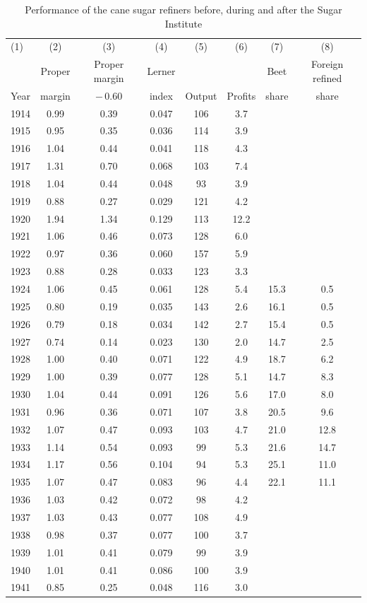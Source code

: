 \begin{table}[htbp]
\centering
\caption{Performance of the cane sugar refiners before, during and after the Sugar Institute}\label{tab:13-gm-t1}
\small
\begin{tabular}{@{}lccccccc@{}}
\toprule
(1) & (2) & (3) & (4) & (5) & (6) & (7) & (8)\\
 & Proper & Proper margin & Lerner & & & Beet & Foreign refined\\
Year & margin & $-\,0.60$ & index & Output & Profits & share & share\\
\midrule
1914 & 0.99 & 0.39 & 0.047 & 106 & 3.7 & & \\
1915 & 0.95 & 0.35 & 0.036 & 114 & 3.9 & & \\
1916 & 1.04 & 0.44 & 0.041 & 118 & 4.3 & & \\
1917 & 1.31 & 0.70 & 0.068 & 103 & 7.4 & & \\
1918 & 1.04 & 0.44 & 0.048 & 93 & 3.9 & & \\
1919 & 0.88 & 0.27 & 0.029 & 121 & 4.2 & & \\
1920 & 1.94 & 1.34 & 0.129 & 113 & 12.2 & & \\
1921 & 1.06 & 0.46 & 0.073 & 128 & 6.0 & & \\
1922 & 0.97 & 0.36 & 0.060 & 157 & 5.9 & & \\
1923 & 0.88 & 0.28 & 0.033 & 123 & 3.3 & & \\
1924 & 1.06 & 0.45 & 0.061 & 128 & 5.4 & 15.3 & 0.5\\
1925 & 0.80 & 0.19 & 0.035 & 143 & 2.6 & 16.1 & 0.5\\
1926 & 0.79 & 0.18 & 0.034 & 142 & 2.7 & 15.4 & 0.5\\
1927 & 0.74 & 0.14 & 0.023 & 130 & 2.0 & 14.7 & 2.5\\
\midrule
1928 & 1.00 & 0.40 & 0.071 & 122 & 4.9 & 18.7 & 6.2\\
1929 & 1.00 & 0.39 & 0.077 & 128 & 5.1 & 14.7 & 8.3\\
1930 & 1.04 & 0.44 & 0.091 & 126 & 5.6 & 17.0 & 8.0\\
1931 & 0.96 & 0.36 & 0.071 & 107 & 3.8 & 20.5 & 9.6\\
1932 & 1.07 & 0.47 & 0.093 & 103 & 4.7 & 21.0 & 12.8\\
1933 & 1.14 & 0.54 & 0.093 & 99 & 5.3 & 21.6 & 14.7\\
1934 & 1.17 & 0.56 & 0.104 & 94 & 5.3 & 25.1 & 11.0\\
1935 & 1.07 & 0.47 & 0.083 & 96 & 4.4 & 22.1 & 11.1\\
1936 & 1.03 & 0.42 & 0.072 & 98 & 4.2 & & \\
1937 & 1.03 & 0.43 & 0.077 & 108 & 4.9 & & \\
1938 & 0.98 & 0.37 & 0.077 & 100 & 3.7 & & \\
1939 & 1.01 & 0.41 & 0.079 & 99 & 3.9 & & \\
1940 & 1.01 & 0.41 & 0.086 & 100 & 3.9 & & \\
1941 & 0.85 & 0.25 & 0.048 & 116 & 3.0 & & \\
\bottomrule
\end{tabular}


\end{table}
